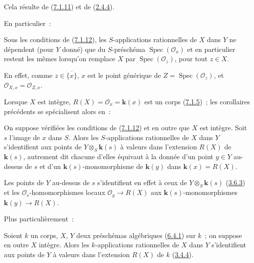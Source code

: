 Cela résulte de (\hyperref[I.7.1.11-fr]{7.1.11}) et de
(\hyperref[I.2.4.4-fr]{2.4.4}).

En particulier~:

\begin{corollary}[7.1.14]
\label{I.7.1.14-fr}
Sous les conditions de \textup{(\hyperref[I.7.1.12-fr]{7.1.12})}, les $S$-applications
rationnelles de $X$ dans $Y$ ne dépendent (pour $Y$ donné) que du
$S$-préschéma $\operatorname{Spec}(\mathscr{O}_x)$ et en particulier restent
les mêmes lorsqu'on remplace $X$ par
$\operatorname{Spec}(\mathscr{O}_z)$, pour tout $z\in X$.
\end{corollary}

En effet, comme $z\in\overline{\{x\}}$, $x$ est le point générique de
$Z=\operatorname{Spec}(\mathscr{O}_z)$, et
$\mathscr{O}_{X,x}=\mathscr{O}_{Z,x}$.

Lorsque $X$ est intègre, $R(X)=\mathscr{O}_x=\boldsymbol{k}(x)$ est un corps
(\hyperref[I.7.1.5-fr]{7.1.5})~; les corollaires précédents se spécialisent
alors en~:

\begin{corollary}[7.1.15]
\label{I.7.1.15-fr}
On suppose vérifiées les conditions de \textup{(\hyperref[I.7.1.12-fr]{7.1.12})} et en
outre que $X$ est intègre. Soit $s$ l'image de $x$ dans $S$. Alors les
$S$-applications rationnelles de $X$ dans $Y$ s'identifient aux points
de $Y\otimes_S \boldsymbol{k}(s)$ à valeurs dans l'extension $R(X)$ de $\boldsymbol{k}(s)$,
autrement dit chacune d'elles équivaut à la donnée d'un point $y\in Y$
au-dessus de $s$ et d'un $\boldsymbol{k}(s)$-monomorphisme de $\boldsymbol{k}(y)$ dans
$\boldsymbol{k}(x)=R(X)$.
\end{corollary}

Les points de $Y$ au-dessus de $s$ s'identifient en effet à ceux de
$Y\otimes_S \boldsymbol{k}(s)$ (\hyperref[I.3.6.3-fr]{3.6.3}) et les
$\mathscr{O}_s$-homomorphismes locaux $\mathscr{O}_y\to R(X)$ aux
$\boldsymbol{k}(s)$-monomorphismes $\boldsymbol{k}(y)\to R(X)$.

Plus particulièrement~:

\begin{corollary}[7.1.16]
\label{I.7.1.16-fr}
Soient $k$ un corps, $X$, $Y$ deux préschémas algébriques
\textup{(\hyperref[I.6.4.1-fr]{6.4.1})} sur $k$~; on suppose en outre $X$ intègre. Alors
les $k$-applications rationnelles de $X$ dans $Y$ s'identifient aux points
de $Y$ à valeurs dans l'extension $R(X)$ de $k$
\textup{(\hyperref[I.3.4.4-fr]{3.4.4})}.
\end{corollary}

